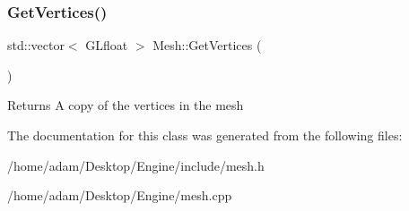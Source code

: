 \subsubsection{\texorpdfstring{Get\+Vertices()}{GetVertices()}}
{\footnotesize\ttfamily std\+::vector$<$ G\+Lfloat $>$ Mesh\+::\+Get\+Vertices (\begin{DoxyParamCaption}{ }\end{DoxyParamCaption})}

\begin{DoxyReturn}{Returns}
A copy of the vertices in the mesh 
\end{DoxyReturn}


The documentation for this class was generated from the following files\+:\begin{DoxyCompactItemize}
\item 
/home/adam/\+Desktop/\+Engine/include/mesh.\+h\item 
/home/adam/\+Desktop/\+Engine/mesh.\+cpp\end{DoxyCompactItemize}
